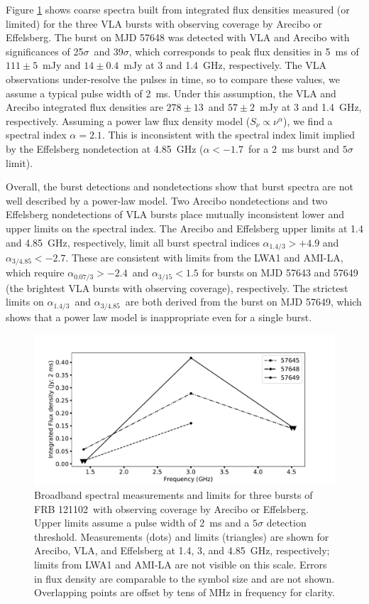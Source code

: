 \documentclass[twocolumn]{aastex61}
\newcommand{\frb}{FRB 121102}
\begin{document}
Figure \ref{fig:multi} shows coarse spectra built from integrated flux densities measured (or limited) for the three VLA bursts with observing coverage by Arecibo or Effelsberg. The burst on MJD 57648 was detected with VLA and Arecibo with significances of 25$\sigma$\ and 39$\sigma$, which corresponds to peak flux densities in 5~ms of $111\pm5$\ mJy and $14\pm0.4$\ mJy at 3 and 1.4~GHz, respectively. The VLA observations under-resolve the pulses in time, so to compare these values, we assume a typical pulse width of 2~ms. Under this assumption, the VLA and Arecibo integrated flux densities are $278\pm13$\ and $57\pm2$\ mJy at 3 and 1.4~GHz, respectively. Assuming a power law flux density model ($S_{\nu} \propto \nu^{\alpha}$), we find a spectral index $\alpha=2.1$. This is inconsistent with the spectral index limit implied by the Effelsberg nondetection at 4.85~GHz ($\alpha<-1.7$\ for a 2~ms burst and $5\sigma$ limit).

Overall, the burst detections and nondetections show that burst spectra are not well described by a power-law model. Two Arecibo nondetections and two Effelsberg nondetections of VLA bursts place mutually inconsistent lower and upper limits on the spectral index. The Arecibo and Effelsberg upper limits at 1.4 and 4.85~GHz, respectively, limit all burst spectral indices $\alpha_{1.4/3}>+4.9$ and $\alpha_{3/4.85}<-2.7$. These are consistent with limits from the LWA1 and AMI-LA, which require $\alpha_{0.07/3}>-2.4$\ and $\alpha_{3/15}<1.5$ for bursts on MJD 57643 and 57649 (the brightest VLA bursts with observing coverage), respectively. The strictest limits on $\alpha_{1.4/3}$\ and $\alpha_{3/4.85}$\ are both derived from the burst on MJD 57649, which shows that a power law model is inappropriate even for a single burst.

\begin{figure}[htb]
\begin{center}
 \includegraphics[width=2\columnwidth]{multispec.pdf}
 \caption{Broadband spectral measurements and limits for three bursts of \frb\ with observing coverage by Arecibo or Effelsberg. Upper limits assume a pulse width of 2~ms and a $5\sigma$ detection threshold. Measurements (dots) and limits (triangles) are shown for Arecibo, VLA, and Effelsberg at 1.4, 3, and 4.85~GHz, respectively; limits from LWA1 and AMI-LA are not visible on this scale. Errors in flux density are comparable to the symbol size and are not shown. Overlapping points are offset by tens of MHz in frequency for clarity.
 \label{fig:multi}}
\end{center}
\end{figure}
\end{document}
